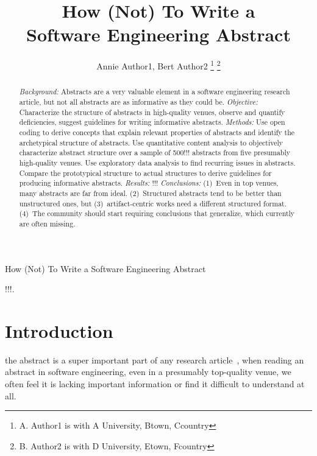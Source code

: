 \documentclass[10pt,journal,compsoc]{IEEEtran}
\begin{document}
\title{How (Not) To Write a\\Software Engineering Abstract}

\author{Annie Author1, Bert Author2
\thanks{A. Author1 is with A University, Btown, Ccountry}
\thanks{B. Author2 is with D University, Etown, Fcountry}}

%
{How (Not) To Write a Software Engineering Abstract}

\maketitle

\begin{abstract}  %
\emph{Background:}
Abstracts are a very valuable element in a software engineering research article,
but not all abstracts are as informative as they could be.
\emph{Objective:}
Characterize the structure of abstracts in high-quality venues,
observe and quantify deficiencies,
suggest guidelines for writing informative abstracts.
\emph{Methods:}
Use open coding to derive concepts that explain relevant properties of abstracts
and identify the archetypical structure of abstracts.
Use quantitative content analysis to objectively characterize abstract structure
over a sample of 500!!! abstracts from five presumably high-quality venues.
Use exploratory data analysis to find recurring issues in abstracts.
Compare the prototypical structure to actual structures to derive
guidelines for producing informative abstracts.
\emph{Results:}
!!!
\emph{Conclusions:}
(1)~Even in top venues, many abstracts are far from ideal.
(2)~Structured abstracts tend to be better than unstructured ones,
but (3)~artifact-centric works need a different structured format.
(4)~The community should start requiring conclusions that generalize,
which currently are often missing.
\end{abstract}

\begin{IEEEkeywords}
!!!.
\end{IEEEkeywords}


\section{Introduction}
 the abstract is a super important part of any research article~\cite{Lang22},
when reading an abstract in software engineering, even in a presumably top-quality venue,
we often feel it is lacking important information or find it difficult to understand at all.
\end{document}
